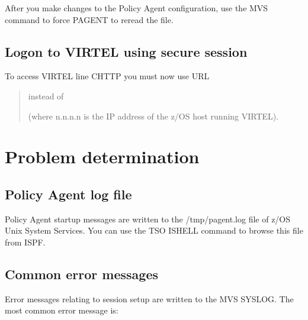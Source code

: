 \documentclass[letterpaper,10pt,english]{sphinxmanual}
\begin{document}
\sphinxAtStartPar
After you make changes to the Policy Agent configuration, use the MVS command  to force PAGENT to reread the file.


\subsection{Logon to VIRTEL using secure session}
\label{\detokenize{connectivity_guide:logon-to-virtel-using-secure-session}}
\sphinxAtStartPar
To access VIRTEL line C\sphinxhyphen{}HTTP you must now use URL
\begin{quote}

\sphinxAtStartPar
{} instead of 

\sphinxAtStartPar
(where n.n.n.n is the IP address of the z/OS host running VIRTEL).
\end{quote}

\newpage

\ignorespaces 

\section{Problem determination}
\label{\detokenize{connectivity_guide:problem-determination}}\label{\detokenize{connectivity_guide:index-165}}

\subsection{Policy Agent log file}
\label{\detokenize{connectivity_guide:policy-agent-log-file}}
\sphinxAtStartPar
Policy Agent startup messages are written to the /tmp/pagent.log file of z/OS Unix System Services. You can use the TSO ISHELL command to browse this file from ISPF.


\subsection{Common error messages}
\label{\detokenize{connectivity_guide:common-error-messages}}
\sphinxAtStartPar
Error messages relating to session setup are written to the MVS SYSLOG. The most common error message is:
\end{document}
